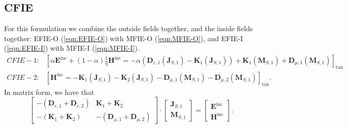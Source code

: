 \documentclass[a4paper,10pt]{book}
\newcommand{\field}[1]{\mathbf{#1}}
\newcommand{\current}[1]{\mathbf{#1}}
\newcommand{\operator}[1]{\mathbf{#1}}
\begin{document}
\subsection{CFIE}
%
\par
For this formulation we combine the outside fields together, and the inside fields together: EFIE-O (\ref{eqn:EFIE-O}) with MFIE-O (\ref{eqn:MFIE-O}), and EFIE-I (\ref{eqn:EFIE-I}) with MFIE-I (\ref{eqn:MFIE-I}).
\begin{eqnarray}
CFIE-1: & \boxed{
\left[\alpha \field{E}^\text{inc} + \left(1-\alpha \right) \frac{1}{\eta}\field{H}^\text{inc} =  - \alpha \left(\operator{D}_{\varepsilon, 1}\left(\current{J}_{S,1}\right) - \operator{K}_{1}\left(\current{J}_{S,1}\right) \right) + \operator{K}_{1}\left(\current{M}_{S,1}\right) + \operator{D}_{\mu, 1}\left(\current{M}_{S,1}\right) \right]_\text{tan} } \\
CFIE-2: & \boxed{
\left[\field{H}^\text{inc} = - \operator{K}_{1}\left(\current{J}_{S,1}\right) - \operator{K}_{2}\left(\current{J}_{S,1}\right) - \operator{D}_{\mu, 1}\left(\current{M}_{S,1}\right) - \operator{D}_{\mu, 2}\left(\current{M}_{S,1}\right)  \right]_\text{tan} }.
\end{eqnarray}
In matrix form, we have that
\begin{equation}
\left[
\begin{matrix}
  - \left(\operator{D}_{\varepsilon, 1} + \operator{D}_{\varepsilon, 2} \right) & \operator{K}_{1} + \operator{K}_{2} \\
  -\left(\operator{K}_{1} + \operator{K}_{2} \right) & - \left(\operator{D}_{\mu, 1} + \operator{D}_{\mu, 2}\right)
\end{matrix}
\right]
\cdot 
\left[
\begin{matrix}
  \current{J}_{S,1} \\
  \current{M}_{S,1}  
\end{matrix}
\right]
=
\left[
\begin{matrix}
  \field{E}^\text{inc} \\
  \field{H}^\text{inc}
\end{matrix}
\right].
\end{equation}
\end{document}
